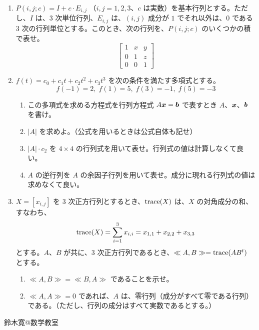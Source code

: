 \documentclass[11pt]{jarticle}
\newcommand{\bb}{\mbox{\boldmath $b$}}
\newcommand{\bx}{\mbox{\boldmath $x$}}
\newcommand{\tr}{\mbox{{\rm trace}}}
\begin{document}
\begin{enumerate}
\item $P(i,j;c) = I + c\cdot E_{i,j}$ （$i, j = 1,2,3$、$c$ は実数）を基本行列とする。ただし、$I$ は、$3$ 次単位行列、$E_{i,j}$ は、$(i,j)$ 成分が $1$ でそれ以外は、$0$ である $3$ 次の行列単位とする。このとき、次の行列を、$P(i,j;c)$ のいくつかの積で表せ。
$$\left[\begin{array}{ccc} 1 & x & y \\ 0 & 1 & z \\ 0 & 0 & 1 \end{array}\right]$$

\item $f(t) = c_0 + c_1t + c_2t^2 + c_3t^3$ を次の条件を満たす多項式とする。%
$$f(-1) = 2, \;f(1) = 5,\;f(3) = -1,\;f(5) = -3$$
\begin{enumerate}
\item この多項式を求める方程式を行列方程式 $A\bx = \bb$ で表すとき $A$、$\bx$、$\bb$ を書け。
\item $|A|$ を求めよ。（公式を用いるときは公式自体も記せ）
\item $|A|\cdot c_2$ を $4\times 4$ の行列式を用いて表せ。行列式の値は計算しなくて良い。
\item $A$ の逆行列を $A$ の余因子行列を用いて表せ。成分に現れる行列式の値は求めなくて良い。
\end{enumerate}

\item $X = [x_{i,j}]$ を $3$ 次正方行列とするとき、$\tr(X)$ は、$X$ の対角成分の和、すなわち、
$$\tr(X) = \sum_{i = 1}^3 x_{i,i} = x_{1,1} + x_{2,2} + x_{3,3}$$
とする。$A$、$B$ が共に、$3$ 次正方行列であるとき、$\ll A,B \gg = \tr (AB^t)$ とする。
	\begin{enumerate}
	\item $\ll A,B \gg  = \ll B,A \gg$ であることを示せ。
	\item $\ll A,A \gg = 0$ であれば、$A$ は、零行列（成分がすべて零である行列）である。（ただし、行列の成分はすべて実数であるとする。）
	\end{enumerate}
\end{enumerate}

\begin{flushright}
鈴木寛@数学教室
\end{flushright}
\end{document}
